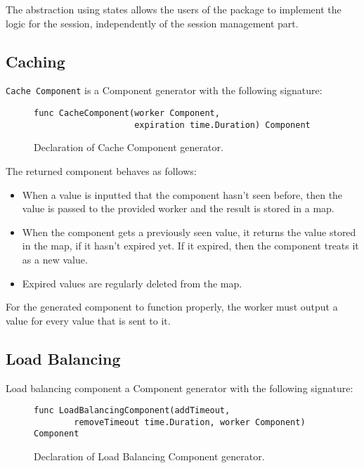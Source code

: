 \documentclass[12pt,a4paper]{article}
\begin{document}
The abstraction using states allows the users of the package to implement the
logic for the session, independently of the session management part.

\subsection{Caching}
\texttt{Cache Component} is a Component generator with the following signature:

\begin{figure}[h]
\centering
\begin{lstlisting}
func CacheComponent(worker Component, 
					expiration time.Duration) Component
\end{lstlisting}
\caption[scale=1.0]{Declaration of Cache Component generator.}
\label{fig:cacheComp}
\end{figure}

The returned component behaves as follows:
\begin{itemize}
	\item When a value is inputted that the component hasn't seen before, then
				the value is passed to the provided worker and the result is stored in
				a map.
	\item When the component gets a previously seen value, it returns the value
			  stored in the map, if it hasn't expired yet. If it expired, then the component
				treats it as a new value.
	\item Expired values are regularly deleted from the map.
\end{itemize}

For the generated component to function properly, the worker must output
a value for every value that is sent to it.

\subsection{Load Balancing}
Load balancing component a Component generator with the following signature:

\begin{figure}[h]
\centering
\begin{lstlisting}
func LoadBalancingComponent(addTimeout, 
		removeTimeout time.Duration, worker Component) Component
\end{lstlisting}
\caption[scale=1.0]{Declaration of Load Balancing Component generator.}
\label{fig:loadComp}
\end{figure}
\end{document}

